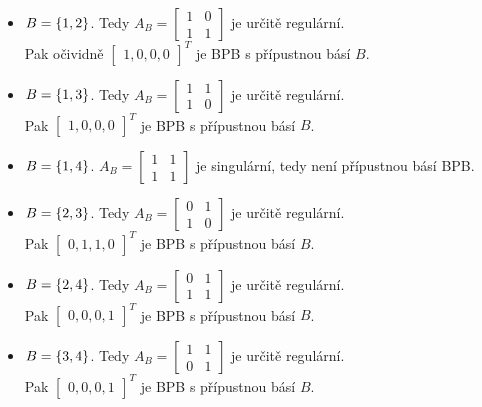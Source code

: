 \begin{itemize}
    \item $B = \left\lbrace 1,2 \right\rbrace$. Tedy $A_B = 
        \begin{bmatrix}
            1 & 0 \\
            1 & 1
        \end{bmatrix}$ je určitě regulární.\\
        Pak očividně $\begin{bmatrix}1, 0, 0, 0\end{bmatrix}^T$ je BPB s přípustnou básí $B$.
    \item $B = \left\lbrace 1,3 \right\rbrace$. Tedy $A_B = 
        \begin{bmatrix}
            1 & 1 \\
            1 & 0
        \end{bmatrix}$ je určitě regulární.\\
        Pak $\begin{bmatrix}1, 0, 0, 0\end{bmatrix}^T$ je BPB s přípustnou básí $B$.
    \item $B = \left\lbrace 1,4 \right\rbrace$. $A_B = 
        \begin{bmatrix}
            1 & 1 \\
            1 & 1
        \end{bmatrix}$ je singulární, tedy není přípustnou básí BPB.
    \item $B = \left\lbrace 2,3 \right\rbrace$. Tedy $A_B = 
        \begin{bmatrix}
            0 & 1 \\
            1 & 0
        \end{bmatrix}$ je určitě regulární.\\
        Pak $\begin{bmatrix}0, 1, 1, 0\end{bmatrix}^T$ je BPB s přípustnou básí $B$.
    \item $B = \left\lbrace 2,4 \right\rbrace$. Tedy $A_B = 
        \begin{bmatrix}
            0 & 1 \\
            1 & 1
        \end{bmatrix}$ je určitě regulární.\\
        Pak $\begin{bmatrix}0, 0, 0, 1\end{bmatrix}^T$ je BPB s přípustnou básí $B$.
    \item $B = \left\lbrace 3,4 \right\rbrace$. Tedy $A_B = 
        \begin{bmatrix}
            1 & 1 \\
            0 & 1
        \end{bmatrix}$ je určitě regulární.\\
        Pak $\begin{bmatrix}0, 0, 0, 1\end{bmatrix}^T$ je BPB s přípustnou básí $B$.
\end{itemize}

